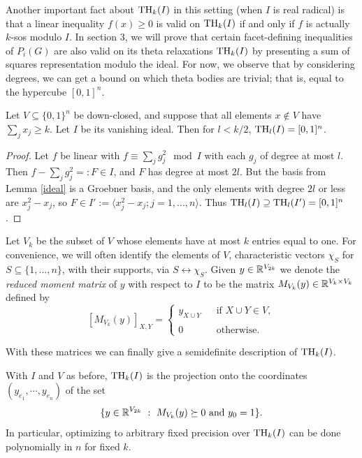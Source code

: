 Another important fact about $\textup{TH}_k(I)$ in this setting (when $I$ is real radical) is that a linear inequality $f(x) \geq 0$ is valid on $\textup{TH}_k(I)$ if and only if $f$ is actually $k$-sos modulo $I$.
In section 3, we will prove that certain facet-defining inequalities of $P_i(G)$ are also valid on its theta relaxations $\textup{TH}_k(I)$ by presenting a sum of squares representation modulo the ideal. For now, we observe that by considering degrees, we can get a bound on which theta bodies are trivial; that is, equal to the hypercube $[0,1]^n$.

\begin{lemma} \label{lowerbound}
Let $V \subseteq \{0,1\}^n$ be down-closed, and suppose that all elements $x \notin V$ have $\sum_j x_j \ge k$. Let $I$ be its vanishing ideal. Then 
for $l < k/2$, $\textup{TH}_l(I) = [0,1]^n$.
\end{lemma}
\begin{proof}
Let $f$ be linear with $f \equiv \sum_j g_j^2 \mod I$ with each $g_j$ of degree at most $l$. Then $f - \sum_j g_j^2 =: F \in I$, and $F$ has degree at most $2l$. But the basis from Lemma \ref{ideal} is a Groebner basis, and the only elements with degree $2l$ or less are $x_j^2 - x_j$, so $F \in I' := \langle x_j^2 - x_j ;j = 1, \ldots, n\rangle$. Thus $\textup{TH}_l(I) \supseteq \textup{TH}_l(I') = [0,1]^n$.
\end{proof}


Let $V_k$ be the subset of $V$ whose elements have at most $k$ entries equal to one. For convenience, we will often identify the elements of $V$, characteristic vectors $\chi_S$ for $S \subseteq \{1,\ldots,n\}$, with their supports, via $S \leftrightarrow \chi_S$. Given $y \in \mathbb{R}^{V_{2k}}$ we denote the {\em reduced 
moment matrix} of $y$ with respect to $I$ to be the matrix $M_{V_k}(y) \in \mathbb{R}^{V_k \times V_k}$ defined by 
$$[M_{V_k}(y)]_{X,Y}=
\left\{  
\begin{array}{ll} 
y_{X \cup Y} & \ \ \textrm{ if } X \cup Y \in V, \\
\\
0            & \ \ \textrm{ otherwise. }   
\end{array} 
\right.$$

With these matrices we can finally give a semidefinite description of $\textup{TH}_k(I)$.

\begin{proposition}
With $I$ and $V$ as before, $\textup{TH}_k(I)$ is the projection onto the coordinates $(y_{e_1}, \cdots, y_{e_n})$ of the set
$$\{y \in \RR^{V_{2k}}\ : \ M_{V_k}(y) \succeq 0 \textrm{ and } y_{0}=1\}.$$
In particular, optimizing to arbitrary fixed precision over $\textup{TH}_k(I)$ can be done polynomially in $n$ for fixed $k$.
\end{proposition}

